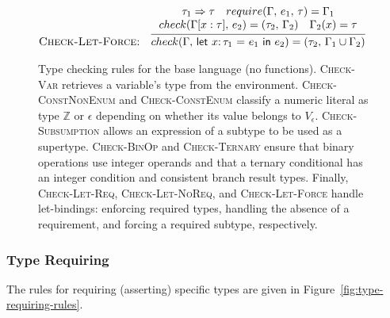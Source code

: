 \documentclass[10pt,conference]{IEEEtran}
\newcommand{\Z}{\ensuremath{\mathbb{Z}}}
\newcommand{\lett}[4]{\ensuremath{\mathsf{let}\ #1\mathsf{:}\,#2\ \mathsf{=}\ #3\ \mathsf{in}\ #4}}
\newcommand{\checktype}[4]{\ensuremath{{check}(#1,\,#2)=(#3,\,#4)}}
\newcommand{\requiretype}[4]{\ensuremath{{require}(#1,\,#2,\,#3)=#4}}
\newcommand{\forcerequire}[2]{\ensuremath{#1\Rightarrow#2}}
\begin{document}
\begin{figure*}[ht]
\begin{framed}
\begin{align*}
{\begin{array}{c}
\end{array}
} \\
\text{\textsc{Check-Let-Force:}} &\quad \infer{\checktype{\Gamma}{\lett{x}{\tau_1}{e_1}{e_2}}{\tau_2}{\Gamma_1 \cup \Gamma_2}}{
\begin{array}{c}
\forcerequire{\tau_1}{\tau} \quad \requiretype{\Gamma}{e_1}{\tau}{\Gamma_1} \\
\checktype{\Gamma[x:\tau]}{e_2}{\tau_2}{\Gamma_2} \quad \Gamma_2(x) = \tau
\end{array}
}
\end{align*}
\end{framed}
\caption{Type checking rules for the base language (no functions). \textsc{Check-Var} retrieves a variable's type from the environment. \textsc{Check-ConstNonEnum} and \textsc{Check-ConstEnum} classify a numeric literal as type $\Z$ or $\epsilon$ depending on whether its value belongs to $V_\epsilon$. \textsc{Check-Subsumption} allows an expression of a subtype to be used as a supertype. \textsc{Check-BinOp} and \textsc{Check-Ternary} ensure that binary operations use integer operands and that a ternary conditional has an integer condition and consistent branch result types. Finally, \textsc{Check-Let-Req}, \textsc{Check-Let-NoReq}, and \textsc{Check-Let-Force} handle let-bindings: enforcing required types, handling the absence of a requirement, and forcing a required subtype, respectively.}
\label{fig:type-checking-rules}
\end{figure*}

\subsubsection{Type Requiring}
The rules for requiring (asserting) specific types are given in Figure~\ref{fig:type-requiring-rules}.
\end{document}
